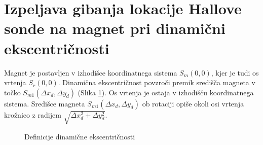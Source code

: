 \section{Izpeljava gibanja lokacije Hallove sonde na magnet pri dinamični ekscentričnosti}
Magnet je postavljen v izhodišce koordinatnega sistema $S_m(0,0)$, kjer je tudi os vrtenja $S_r(0,0)$. Dinamična ekscentričnost povzroči premik središča magneta v točko $S_{m1}(\Delta x_d,\Delta y_d)$ (Slika \ref{fig:def_din_eks}).
Os vrtenja je ostaja v izhodišču koordinatnega sistema. Središce magneta $S_{m1}(\Delta x_d,\Delta y_d)$ ob rotaciji opiše okoli osi vrtenja krožnico z radijem $\sqrt{\Delta x_d^2+\Delta y_d^2}$.%
\begin{figure}[!ht]
	\centering
	\caption{Definicije dinamične ekscentričnosti}
	\label{fig:def_din_eks}
\end{figure}


